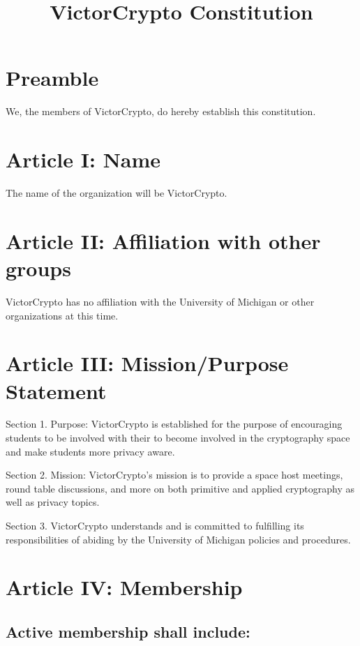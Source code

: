 \documentclass[11pt]{article}
\title{\textbf{VictorCrypto Constitution}}
\begin{document}
    \maketitle


    \section{Preamble}
    We, the members of VictorCrypto, do hereby establish this constitution.


    \section{Article I: Name}

    The name of the organization will be VictorCrypto.


    \section{Article II: Affiliation with other groups}

    VictorCrypto has no affiliation with the University of Michigan or other organizations at this time.


    \section{Article III: Mission/Purpose Statement}

    Section 1. Purpose: VictorCrypto is established for the purpose of encouraging students to be involved with their
    to become involved in the cryptography space and make students more privacy aware.

    Section 2. Mission: VictorCrypto's mission is to provide a space host meetings, round table discussions, and
    more on both primitive and applied cryptography as well as privacy topics.

    Section 3. VictorCrypto understands and is committed to fulfilling its responsibilities of abiding by the University
    of Michigan policies and procedures.



    \section{Article IV: Membership}

    \subsection{Active membership shall include:}
\end{document}
